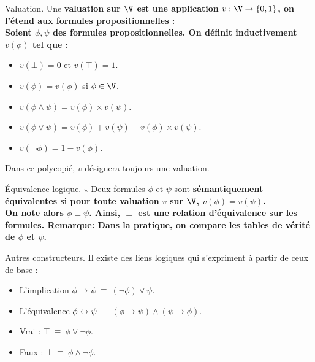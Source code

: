 \documentclass[french, 11pt]{article}
\begin{document}
\begin{defi}{Valuation.}{}
    Une \bf{valuation} sur $\V$ est une application $v:\V\to\{0,1\}$, on l'étend aux formules propositionnelles :\\
    Soient $\phi,\psi$ des formules propositionnelles. On définit inductivement $v(\phi)$ tel que :
    \begin{itemize}[label=$\hra$]
        \item $v(\bot)=0$ et $v(\top)=1$.
        \item $v(\phi)=v(\phi)$ si $\phi\in\V$.
        \item $v(\phi\land\psi)=v(\phi)\times v(\psi)$.
        \item $v(\phi\lor\psi)=v(\phi) + v(\psi) - v(\phi)\times v(\psi)$.
        \item $v(\lnot\phi)=1-v(\phi)$.
    \end{itemize}
    Dans ce polycopié, $v$ désignera toujours une valuation.
\end{defi}

\begin{defi}{Équivalence logique. $\star$}{}
    Deux formules $\phi$ et $\psi$ sont \bf{sémantiquement équivalentes} si pour toute valuation $v$ sur $\V$, $v(\phi)=v(\psi)$.\\
    On note alors $\phi\equiv\psi$. Ainsi, $\equiv$ est une relation d'équivalence sur les formules.\n
    \bf{Remarque:} Dans la pratique, on compare les tables de vérité de $\phi$ et $\psi$.
\end{defi}

\vspace*{-0.5cm}

\begin{defi}{Autres constructeurs.}{}
    Il existe des liens logiques qui s'expriment à partir de ceux de base :
    \begin{itemize}[label=$\hra$]
        \item L'implication $\phi \rightarrow \psi ~ \equiv ~ (\lnot\phi)\lor\psi$.
        \item L'équivalence $\phi \leftrightarrow \psi ~ \equiv ~ (\phi\rightarrow\psi)\land(\psi\rightarrow\phi)$.
        \item Vrai : $\top ~ \equiv ~ \phi\lor\lnot\phi$.
        \item Faux : $\bot ~ \equiv ~ \phi\land\lnot\phi$.
    \end{itemize}
\end{defi}

\vspace*{-0.5cm}
\end{document}
